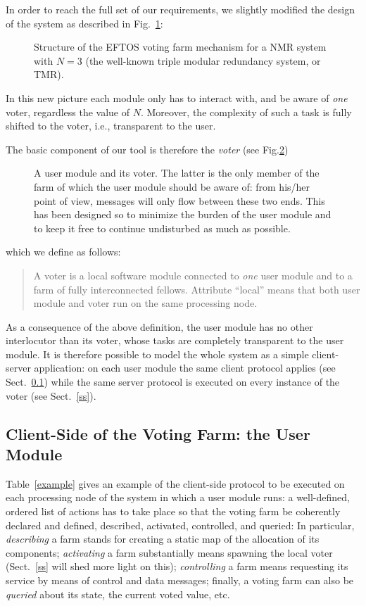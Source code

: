 \documentclass[11pt]{article}
\begin{document}
In order to reach the full set of our requirements, we slightly
modified the design of the system as described in Fig.~\ref{ronew}:
\begin{figure}
\centerline{}
\caption{Structure of the EFTOS voting farm mechanism for a NMR{} system with
$N=3$ (the well-known triple modular redundancy system, or TMR).}\label{ronew}
\end{figure}
In this new picture each module only has to interact with, and be aware 
of {\em one\/} voter,
regardless the value of $N$. Moreover, the complexity of such a task
is fully shifted to the voter, i.e., transparent to the user.



The basic component of our tool is therefore the {\em voter\/} (see Fig.\ref{voter})
\begin{figure}
\centerline{}
\caption{A user module and its voter. The latter is the
only member of the farm of which the user module should be aware of:
from his/her point of view, messages will only flow between these two ends.
This has been designed so to minimize the burden of the user module
and to keep it free to continue undisturbed as much as possible.}\label{voter}
\end{figure}
which we define as follows:
\begin{quote}
A voter is a local software module connected to {\em one\/}
user module and to a farm of fully interconnected fellows.
Attribute ``local'' means that both user module and voter
run on the same processing node.
\end{quote}


As a consequence of the above definition, the user module has
no other interlocutor than its voter, whose tasks are completely
transparent to the user module. It is therefore possible to model
the whole system as a simple client-server application:
on each user module the same client protocol applies (see Sect.~\ref{cs})
while the same server protocol is executed on every instance of the voter
(see Sect.~\ref{ss}).



\subsection{Client-Side of the Voting Farm: the User Module}\label{cs}
Table~\ref{example} gives an example of the client-side protocol
to be executed on each processing node of the system in which a
user module runs: a well-defined, ordered list of actions has to take place
so that the voting farm be coherently declared and defined,
described, activated, controlled, and queried:
In particular, {\em describing\/} a farm stands for
creating a static map of the allocation of its components; 
{\em activating\/} a farm substantially
means spawning the local voter (Sect.~\ref{ss} will shed more light
on this); {\em controlling\/} a farm means requesting its service
by means of control and data messages;
finally, a voting farm can also be {\em queried\/} about its state, 
the current voted value, etc.
\end{document}
